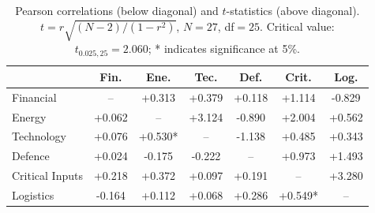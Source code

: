 \begin{table}[htbp]
\centering
\caption{Pearson correlations (below diagonal) and $t$-statistics (above diagonal).
$t = r\sqrt{(N-2)/(1-r^2)}$, $N=27$, df$=25$. Critical value: $t_{0.025,25} = 2.060$;
* indicates significance at 5\%.}
\label{tab:corr-tstat}
\small
\setlength{\tabcolsep}{4pt}
\begin{tabular*}{\textwidth}{@{\extracolsep{\fill}}
  l S S S S S S @{}}
\toprule
 & {\textbf{Fin.}} & {\textbf{Ene.}} & {\textbf{Tec.}} & {\textbf{Def.}} & {\textbf{Crit.}} & {\textbf{Log.}} \\
\midrule
  Financial       & {--}     & {+0.313} & {+0.379} & {+0.118} & {+1.114} & {-0.829} \\
  Energy          & {+0.062} & {--}     & {+3.124} & {-0.890} & {+2.004} & {+0.562} \\
  Technology      & {+0.076} & {+0.530*}& {--}     & {-1.138} & {+0.485} & {+0.343} \\
  Defence         & {+0.024} & {-0.175} & {-0.222} & {--}     & {+0.973} & {+1.493} \\
  Critical Inputs & {+0.218} & {+0.372} & {+0.097} & {+0.191} & {--}     & {+3.280} \\
  Logistics       & {-0.164} & {+0.112} & {+0.068} & {+0.286} & {+0.549*}& {--}     \\
\bottomrule
\end{tabular*}
\end{table}
